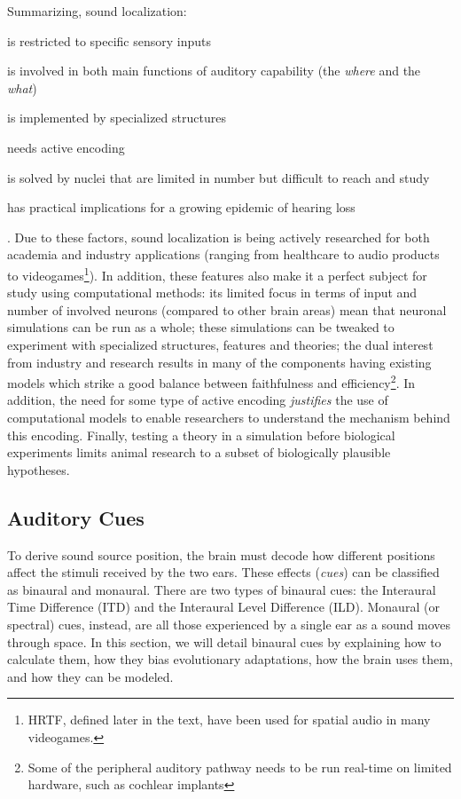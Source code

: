 \documentclass[11pt,a4paper]{article}
\newcommand{\parspace}{\vspace{7pt}}
\begin{document}
\parspace
Summarizing, sound localization: 
\begin{inlinelist}
    \item is restricted to specific sensory inputs
    \item is involved in both main functions of auditory capability (the \textit{where} and the \textit{what})
    \item is implemented by specialized structures
    \item needs active encoding
    \item is solved by nuclei that are limited in number but difficult to reach and study
    \item has practical implications for a growing epidemic of hearing loss
\end{inlinelist}.
Due to these factors, sound localization is being actively researched for both academia and industry applications (ranging from healthcare to audio products to videogames\footnote{HRTF, defined later in the text, have been used for spatial audio in many videogames.}). In addition, these features also make it a perfect subject for study using computational methods: its limited focus in terms of input and number of involved neurons (compared to other brain areas) mean that neuronal simulations can be run as a whole; these simulations can be tweaked to experiment with specialized structures, features and theories; the dual interest from industry and research results in many of the components having existing models which strike a good balance between faithfulness and efficiency\footnote{Some of the peripheral auditory pathway needs to be run real-time on limited hardware, such as cochlear implants}. In addition, the need for some type of active encoding \textit{justifies} the use of computational models to enable researchers to understand the mechanism behind this encoding. Finally, testing a theory in a simulation before biological experiments limits animal research to a subset of biologically plausible hypotheses.


\subsection{Auditory Cues}\label{sec:cues}
To derive sound source position, the brain must decode how different positions affect the stimuli received by the two ears. These effects (\textit{cues}) can be classified as binaural and monaural. There are two types of binaural cues: the Interaural Time Difference (ITD) and the Interaural Level Difference (ILD). Monaural (or spectral) cues, instead, are all those experienced by a single ear as a sound moves through space. In this section, we will detail binaural cues by explaining how to calculate them, how they bias evolutionary adaptations, how the brain uses them, and how they can be modeled.
\end{document}
